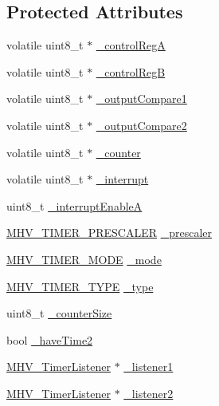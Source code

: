 \subsection*{\-Protected \-Attributes}
\begin{DoxyCompactItemize}
\item 
volatile uint8\-\_\-t $\ast$ \hyperlink{class_m_h_v___timer8_a2370aea351bfaed055c42b2ecfe6c930}{\-\_\-control\-Reg\-A}
\item 
volatile uint8\-\_\-t $\ast$ \hyperlink{class_m_h_v___timer8_ab713d8f3b71551b6146703d9ecfc5301}{\-\_\-control\-Reg\-B}
\item 
volatile uint8\-\_\-t $\ast$ \hyperlink{class_m_h_v___timer8_ab69320fb8fee00da797099aa633fdd92}{\-\_\-output\-Compare1}
\item 
volatile uint8\-\_\-t $\ast$ \hyperlink{class_m_h_v___timer8_a81be7741280c03ccfa31d22a20b5609b}{\-\_\-output\-Compare2}
\item 
volatile uint8\-\_\-t $\ast$ \hyperlink{class_m_h_v___timer8_ae99499e5828be6ed0c312cd43821a7c3}{\-\_\-counter}
\item 
volatile uint8\-\_\-t $\ast$ \hyperlink{class_m_h_v___timer8_a98e41d7d3ceef4b8fce11644ea110ee9}{\-\_\-interrupt}
\item 
uint8\-\_\-t \hyperlink{class_m_h_v___timer8_ad2fac7586dc6104b1c7323c84ba88559}{\-\_\-interrupt\-Enable\-A}
\item 
\hyperlink{_m_h_v___timer8_8h_a2e7ef9dbc200586bf55b0003896de599}{\-M\-H\-V\-\_\-\-T\-I\-M\-E\-R\-\_\-\-P\-R\-E\-S\-C\-A\-L\-E\-R} \hyperlink{class_m_h_v___timer8_a2d610b4bbd5aef2db6a4062dbd063aba}{\-\_\-prescaler}
\item 
\hyperlink{_m_h_v___timer8_8h_ae9de6a07a79f63ce9eeb6ba2bc9b053d}{\-M\-H\-V\-\_\-\-T\-I\-M\-E\-R\-\_\-\-M\-O\-D\-E} \hyperlink{class_m_h_v___timer8_a6f6b063d32d0778e8d1a91c561c79f13}{\-\_\-mode}
\item 
\hyperlink{_m_h_v___timer8_8h_aec9828462529f91a09d74c9abb33b611}{\-M\-H\-V\-\_\-\-T\-I\-M\-E\-R\-\_\-\-T\-Y\-P\-E} \hyperlink{class_m_h_v___timer8_a10c0fdfbbe901b923ea7fb1c0fc9690c}{\-\_\-type}
\item 
uint8\-\_\-t \hyperlink{class_m_h_v___timer8_a25827d35452ab31f1f0e1beb232a259b}{\-\_\-counter\-Size}
\item 
bool \hyperlink{class_m_h_v___timer8_adffeb4bbdd699814b5d0abd9cf59b3a9}{\-\_\-have\-Time2}
\item 
\hyperlink{class_m_h_v___timer_listener}{\-M\-H\-V\-\_\-\-Timer\-Listener} $\ast$ \hyperlink{class_m_h_v___timer8_a055679c1951c9667749f71e549eb8ccf}{\-\_\-listener1}
\item 
\hyperlink{class_m_h_v___timer_listener}{\-M\-H\-V\-\_\-\-Timer\-Listener} $\ast$ \hyperlink{class_m_h_v___timer8_a3e44a703c1e5c578fb98294f560337b3}{\-\_\-listener2}
\end{DoxyCompactItemize}


